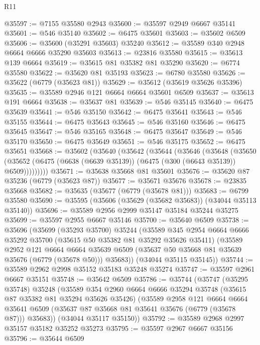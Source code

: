 \begin{lexlean}{R11}
\begin{coremodule}
@35597 := @7155 @35580 @2943
@35600 := @35597 @2949 @6667 @35141
@35601 := @546 @35140
@35602 := @6475 @35601
@35603 := @35602 @6509
@35606 := @35600 (@35291 @35603) @35240
@35612 := @35589 @340 @2948 @6664 @6666 @35290 @35603
@35613 := @23816 @35580
@35615 := @35613 @139 @6664
@35619 := @35615 @81 @35382 @81 @35290
@35620 := @6774 @35580
@35622 := @35620 @81 @35193
@35623 := @6780 @35580
@35626 := @35622 (@6779 (@35623 @81))
@35629 := @35612 (@35619 @35626 @35396)
@35635 := @35589 @2946 @121 @6664 @6664 @35601 @6509
@35637 := @35613 @191 @6664
@35638 := @35637 @81
@35639 := @546 @35145
@35640 := @6475 @35639
@35641 := @546 @35150
@35642 := @6475 @35641
@35643 := @546 @35155
@35644 := @6475 @35643
@35645 := @546 @35160
@35646 := @6475 @35645
@35647 := @546 @35165
@35648 := @6475 @35647
@35649 := @546 @35170
@35650 := @6475 @35649
@35651 := @546 @35175
@35652 := @6475 @35651
@35668 := @35602
    (@35640
      (@35642
        (@35644
          (@35646
            (@35648
              (@35650
                (@35652 (@6475 (@6638 (@6639 @35139)) (@6475 (@300 (@6643 @35139)) @6509)))))))))
@35671 := @35638 @35668 @81 @35601
@35676 := @35620 @87 @35236 (@6779 (@35623 @87))
@35677 := @35671 @35676
@35678 := @23835 @35668
@35682 := @35635 (@35677 (@6779 (@35678 @81)))
@35683 := @6799 @35580
@35690 := @35595 (@35606 (@35629 (@35682 @35683)) (@34044 @35113 @35140))
@35696 := @35589 @2956 @2999 @35147 @35184 @35244 @35275
@35699 := @35597 @2955 @6667 @35146
@35700 := @35640 @6509
@35738 := @35696
    (@35699
      (@35293 @35700)
      @35244
      (@35589
        @345
        @2954
        @6664
        @6666
        @35292
        @35700
        (@35615 @50 @35382 @81 @35292 @35626 @35411)
        (@35589
          @2952
          @121
          @6664
          @6664
          @35639
          @6509
          (@35637 @50 @35668 @81 @35639 @35676 (@6779 (@35678 @50)))
          @35683))
      (@34044 @35115 @35145))
@35744 := @35589 @2962 @2998 @35152 @35183 @35248 @35274
@35747 := @35597 @2961 @6667 @35151
@35748 := @35642 @6509
@35786 := @35744
    (@35747
      (@35295 @35748)
      @35248
      (@35589
        @354
        @2960
        @6664
        @6666
        @35294
        @35748
        (@35615 @87 @35382 @81 @35294 @35626 @35426)
        (@35589
          @2958
          @121
          @6664
          @6664
          @35641
          @6509
          (@35637 @87 @35668 @81 @35641 @35676 (@6779 (@35678 @87)))
          @35683))
      (@34044 @35117 @35150))
@35792 := @35589 @2968 @2997 @35157 @35182 @35252 @35273
@35795 := @35597 @2967 @6667 @35156
@35796 := @35644 @6509

\end{coremodule}
\end{lexlean}
